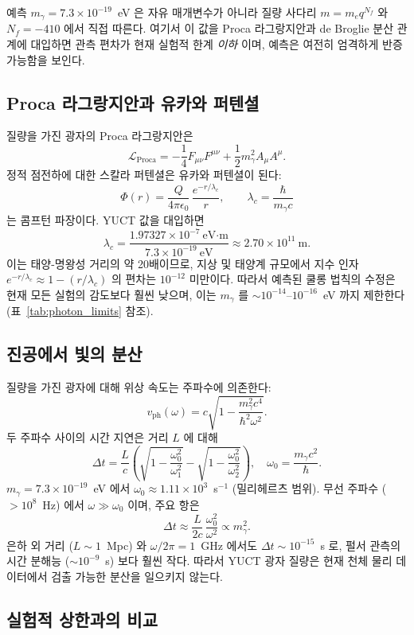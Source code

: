 \documentclass[11pt,a4paper]{article}
\begin{document}
	예측 $m_\gamma = 7.3\times10^{-19}$~eV 은 자유 매개변수가 아니라 질량 사다리 $m = m_e q^{N_f}$ 와 $N_f = -410$ 에서 직접 따른다. 여기서 이 값을 Proca 라그랑지안과 de Broglie 분산 관계에 대입하면 관측 편차가 현재 실험적 한계 \emph{이하} 이며, 예측은 여전히 엄격하게 반증 가능함을 보인다.
	
	\subsection{Proca 라그랑지안과 유카와 퍼텐셜}
	
	질량을 가진 광자의 Proca 라그랑지안은
	\[
	\mathcal{L}_{\text{Proca}} = -\frac14 F_{\mu\nu}F^{\mu\nu} + \frac12 m_\gamma^2 A_\mu A^\mu .
	\]
	정적 점전하에 대한 스칼라 퍼텐셜은 유카와 퍼텐셜이 된다:
	\[
	\Phi(r) = \frac{Q}{4\pi\epsilon_0}\,\frac{e^{-r/\lambda_c}}{r},
	\qquad
	\lambda_c = \frac{\hbar}{m_\gamma c}
	\]
	는 콤프턴 파장이다. YUCT 값을 대입하면
	\[
	\lambda_c = \frac{1.97327\times10^{-7}~\text{eV·m}}{7.3\times10^{-19}~\text{eV}}
	\approx 2.70\times10^{11}~\text{m}.
	\]
	이는 태양-명왕성 거리의 약 20배이므로, 지상 및 태양계 규모에서 지수 인자 $e^{-r/\lambda_c}\approx 1 - (r/\lambda_c)$ 의 편차는 $10^{-12}$ 미만이다. 따라서 예측된 쿨롱 법칙의 수정은 현재 모든 실험의 감도보다 훨씬 낮으며, 이는 $m_\gamma$ 를 $\sim 10^{-14}$–$10^{-16}$~eV 까지 제한한다 (표~\ref{tab:photon_limits} 참조).
	
	\subsection{진공에서 빛의 분산}
	
	질량을 가진 광자에 대해 위상 속도는 주파수에 의존한다:
	\[
	v_{\text{ph}}(\omega) = c\sqrt{1 - \frac{m_\gamma^2 c^4}{\hbar^2\omega^2}} .
	\]
	두 주파수 사이의 시간 지연은 거리 $L$ 에 대해
	\[
	\Delta t = \frac{L}{c}\left( \sqrt{1-\frac{\omega_0^2}{\omega_1^2}} - \sqrt{1-\frac{\omega_0^2}{\omega_2^2}} \right),
	\quad \omega_0 = \frac{m_\gamma c^2}{\hbar}.
	\]
	$m_\gamma = 7.3\times10^{-19}$~eV 에서 $\omega_0 \approx 1.11\times10^{3}$~s$^{-1}$ (밀리헤르츠 범위). 무선 주파수 ($>10^8$~Hz) 에서 $\omega \gg \omega_0$ 이며, 주요 항은
	\[
	\Delta t \approx \frac{L}{2c}\,\frac{\omega_0^2}{\omega^2} \propto m_\gamma^2.
	\]
	은하 외 거리 ($L\sim 1$~Mpc) 와 $\omega/2\pi = 1$~GHz 에서도 $\Delta t \sim 10^{-15}$~s 로, 펄서 관측의 시간 분해능 ($\sim 10^{-9}$~s) 보다 훨씬 작다. 따라서 YUCT 광자 질량은 현재 천체 물리 데이터에서 검출 가능한 분산을 일으키지 않는다.
	
	\subsection{실험적 상한과의 비교}
	
\end{document}
